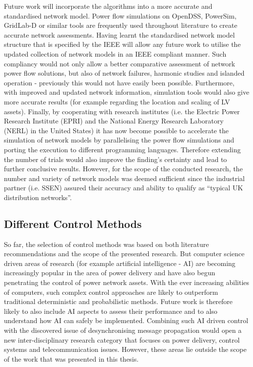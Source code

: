 Future work will incorporate the algorithms into a more accurate and standardised network model.
Power flow simulations on OpenDSS, PowerSim, GridLab-D or similar tools are frequently used throughout literature to create accurate network assessments.
Having learnt the standardised network model structure that is specified by the IEEE will allow any future work to utilise the updated collection of network models in an IEEE compliant manner.
Such compliancy would not only allow a better comparative assessment of network power flow solutions, but also of network failures, harmonic studies and islanded operation - previously this would not have easily been possible.
Furthermore, with improved and updated network information, simulation tools would also give more accurate results (for example regarding the location and scaling of LV assets).
Finally, by cooperating with research institutes (i.e. the Electric Power Research Institute (EPRI) and the National Energy Research Laboratory (NERL) in the United States) it has now become possible to accelerate the simulation of network models by parallelising the power flow simulations and porting the execution to different programming languages.
Therefore extending the number of trials would also improve the finding's certainty and lead to further conclusive results.
However, for the scope of the conducted research, the number and variety of network models was deemed sufficient since the industrial partner (i.e. SSEN) assured their accuracy and ability to qualify as ``typical UK distribution networks''.

\subsection{Different Control Methods}

So far, the selection of control methods was based on both literature recommendations and the scope of the presented research.
But computer science driven areas of research (for example artificial intelligence - AI) are becoming increasingly popular in the area of power delivery and have also begun penetrating the control of power network assets.
With the ever increasing abilities of computers, such complex control approaches are likely to outperform traditional deterministic and probabilistic methods.
Future work is therefore likely to also include AI aspects to assess their performance and to also understand how AI can safely be implemented.
Combining such AI driven control with the discovered issue of desynchronising message propagation would open a new inter-disciplinary research category that focuses on power delivery, control systems and telecommunication issues.
However, these areas lie outside the scope of the work that was presented in this thesis.

